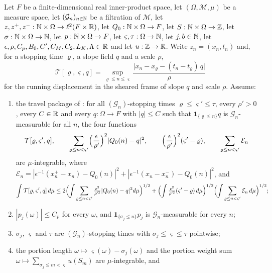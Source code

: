 \begin{lemma}
Let $F$ be a finite-dimensional real inner-product space, let
$(\Omega,\mathcal M,\mu)$ be a measure space, let $(\mathcal G_n)_{n\in\mathbb{N}}$ be a
filtration of $\mathcal M$, let
$z,z^+,z^-:\mathbb{N}\times\Omega\to\ell^2(F\times\mathbb{R})$, let $Q_0:\mathbb{N}\times\Omega\to F$,
let $S:\mathbb{N}\times\Omega\to\mathbb{Z}$, let $\sigma:\mathbb{N}\times\Omega\to\mathbb{N}$, let
$p:\mathbb{N}\times\Omega\to F$, let $\varsigma,\tau:\Omega\to\mathbb{N}$, let $j,b\in\mathbb{N}$, let
$\epsilon,\rho,C_p,B_0,C',C_M,C_2,L_K,\Lambda\in\mathbb{R}$ and let $u:\mathbb{Z}\to\mathbb{R}$. Write
$z_n=(x_n,t_n)$ and, for a stopping time $\varrho$, a slope field $q$ and a
scale $\rho$,
\[
  \mathcal T[\varrho,\varsigma,q]
   =\sup_{\varrho\le n\le\varsigma}
     \frac{\bigl|x_n-x_\varrho-(t_n-t_\varrho)\,q\bigr|}{\rho}
\]
for the running displacement in the sheared frame of slope $q$ and scale
$\rho$. Assume:
\begin{enumerate}
\item\label{it:mftb-pkg} the travel package of
: for all $(\mathcal G_n)$-stopping times
$\varrho\le\varsigma'\le\tau$, every $\rho'>0$, every $C\in\mathbb{R}$ and every
$q:\Omega\to F$ with $|q|\le C$ such that $\mathbf1_{\{\varrho\le n\}}q$ is
$\mathcal G_n$-measurable for all $n$, the four functions
\[
  \mathcal T[\varrho,\varsigma',q],\qquad
  \sum_{\varrho\le n<\varsigma'}\Bigl(\frac{\epsilon}{\rho'}\Bigr)^2|Q_0(n)-q|^2,
  \qquad
  \Bigl(\frac{\epsilon}{\rho'}\Bigr)^2(\varsigma'-\varrho),\qquad
  \sum_{\varrho\le n<\varsigma'}\mathcal E_n
\]
are $\mu$-integrable, where
$\mathcal E_n=|\epsilon^{-1}(x^+_n-x_n)-Q_0(n)|^2
+|\epsilon^{-1}(x_n-x^-_n)-Q_0(n)|^2$, and
\[
  \int\mathcal T[\varrho,\varsigma',q]\,d\mu
  \le2\Bigl(\int\sum_{\varrho\le n<\varsigma'}
      \tfrac{\epsilon^2}{\rho'^2}|Q_0(n)-q|^2d\mu\Bigr)^{1/2}
   +\Bigl(\int\tfrac{\epsilon^2}{\rho'^2}(\varsigma'-\varrho)\,d\mu\Bigr)^{1/2}
    \Bigl(\int\sum_{\varrho\le n<\varsigma'}\mathcal E_n\,d\mu\Bigr)^{1/2};
\]
\item\label{it:mftb-slope} $|p_j(\omega)|\le C_p$ for every $\omega$, and
$\mathbf1_{\{\sigma_j\le n\}}p_j$ is $\mathcal G_n$-measurable for every $n$;
\item\label{it:mftb-st} $\sigma_j$, $\varsigma$ and $\tau$ are
$(\mathcal G_n)$-stopping times with $\sigma_j\le\varsigma\le\tau$ pointwise;
\item\label{it:mftb-int} the portion length
$\omega\mapsto\varsigma(\omega)-\sigma_j(\omega)$ and the portion weight sum
$\omega\mapsto\sum_{\sigma_j\le m<\varsigma}u(S_m)$ are $\mu$-integrable, and

\end{enumerate}
\end{lemma}
